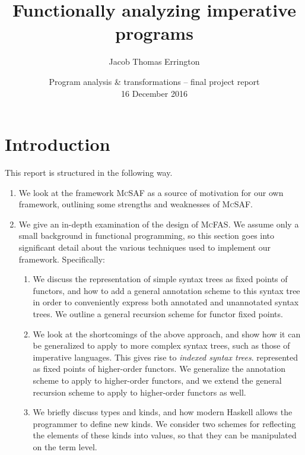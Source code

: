 \documentclass[letterpaper,11pt]{article}
\author{Jacob Thomas Errington}
\title{Functionally analyzing imperative programs}
\date{
  Program analysis \& transformations -- final project report\\
  16 December 2016
}
\newcommand{\mcfas}{\textsc{McFAS}}
\newcommand{\mcsaf}{\textsc{McSAF}}
\begin{document}
\maketitle

\section{Introduction}

This report is structured in the following way.

\begin{enumerate}
  \item
    We look at the framework \mcsaf{} as a source of motivation for our own
    framework, outlining some strengths and weaknesses of \mcsaf{}.

  \item
    We give an in-depth examination of the design of \mcfas{}. We assume only a
    small background in functional programming, so this section goes into
    significant detail about the various techniques used to implement our
    framework. Specifically:

    \begin{enumerate}
      \item
        We discuss the representation of simple syntax trees as fixed points of
        functors, and how to add a general annotation scheme to this syntax
        tree in order to conveniently express both annotated and unannotated
        syntax trees. We outline a general recursion scheme for functor fixed
        points.

      \item
        We look at the shortcomings of the above approach, and show how it can
        be generalized to apply to more complex syntax trees, such as those of
        imperative languages. This gives rise to \emph{indexed syntax trees}.
        represented as fixed points of higher-order functors. We generalize the
        annotation scheme to apply to higher-order functors, and we extend the
        general recursion scheme to apply to higher-order functors as well.

      \item
        We briefly discuss types and kinds, and how modern Haskell allows the
        programmer to define new kinds. We consider two schemes for reflecting
        the elements of these kinds into values, so that they can be
        manipulated on the term level.
    \end{enumerate}


\end{enumerate}
\end{document}

